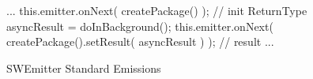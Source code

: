 \begin{figure}[h]
\begin{sourcecode}
\begin{javacode}{}
...
	this.emitter.onNext( createPackage() ); // init
	ReturnType asyncResult = doInBackground();
	this.emitter.onNext( createPackage().setResult( asyncResult ) ); // result
...
\end{javacode}
\caption{SWEmitter Standard Emissions}
\label{code:swemitter-regular-emissions}
\end{sourcecode}
\end{figure}